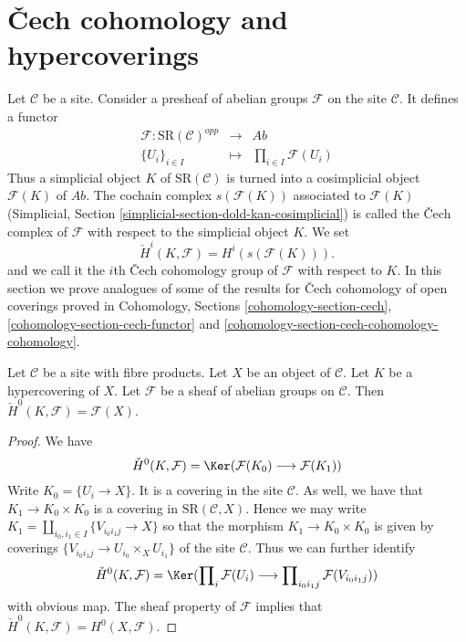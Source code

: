 \section{{\v C}ech cohomology and hypercoverings}
\label{section-hyper-cech}

\noindent
Let $\mathcal{C}$ be a site. Consider a presheaf of
abelian groups $\mathcal{F}$ on the site $\mathcal{C}$.
It defines a functor
\begin{eqnarray*}
\mathcal{F} : \text{SR}(\mathcal{C})^{opp}
& \longrightarrow &
\textit{Ab} \\
\{U_i\}_{i \in I} &
\longmapsto &
\prod\nolimits_{i \in I} \mathcal{F}(U_i)
\end{eqnarray*}
Thus a simplicial object $K$ of $\text{SR}(\mathcal{C})$
is turned into a cosimplicial object $\mathcal{F}(K)$ of $\textit{Ab}$.
The cochain complex $s(\mathcal{F}(K))$ associated to $\mathcal{F}(K)$
(Simplicial, Section
\ref{simplicial-section-dold-kan-cosimplicial})
is called the {\v C}ech complex of $\mathcal{F}$ with
respect to the simplicial object $K$. We set
$$
\check{H}^i(K, \mathcal{F})
=
H^i(s(\mathcal{F}(K))).
$$
and we call it the $i$th {\v C}ech cohomology group
of $\mathcal{F}$ with respect to $K$.
In this section we prove analogues of some of the results for
{\v C}ech cohomology of open coverings proved in
Cohomology, Sections \ref{cohomology-section-cech},
\ref{cohomology-section-cech-functor} and
\ref{cohomology-section-cech-cohomology-cohomology}.

\begin{lemma}
\label{lemma-h0-cech}
Let $\mathcal{C}$ be a site with fibre products.
Let $X$ be an object of $\mathcal{C}$.
Let $K$ be a hypercovering of $X$.
Let $\mathcal{F}$ be a sheaf of abelian groups on $\mathcal{C}$.
Then $\check{H}^0(K, \mathcal{F}) = \mathcal{F}(X)$.
\end{lemma}

\begin{proof}
We have
$$
\check{H}^0(K, \mathcal{F})
=
\Ker(\mathcal{F}(K_0) \longrightarrow \mathcal{F}(K_1))
$$
Write $K_0 = \{U_i \to X\}$. It is a covering in the site
$\mathcal{C}$. As well, we have that $K_1 \to K_0 \times K_0$
is a covering in $\text{SR}(\mathcal{C}, X)$. Hence we may
write $K_1 = \amalg_{i_0, i_1 \in I} \{V_{i_0i_1j} \to X\}$
so that the morphism $K_1 \to K_0 \times K_0$ is given
by coverings $\{V_{i_0i_1j} \to U_{i_0} \times_X U_{i_1}\}$
of the site $\mathcal{C}$. Thus we can further identify
$$
\check{H}^0(K, \mathcal{F})
=
\Ker(
\prod\nolimits_i \mathcal{F}(U_i)
\longrightarrow
\prod\nolimits_{i_0i_1 j} \mathcal{F}(V_{i_0i_1j})
)
$$
with obvious map. The sheaf property of $\mathcal{F}$
implies that $\check{H}^0(K, \mathcal{F}) = H^0(X, \mathcal{F})$.
\end{proof}

